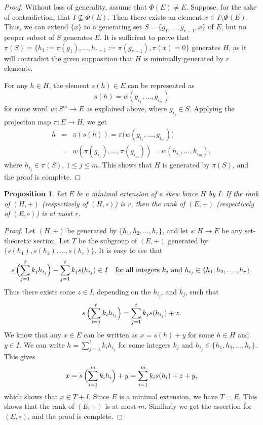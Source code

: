 \documentclass[11pt]{amsart}
\theoremstyle{thrm}
\theoremstyle{plain}
\newtheorem{prop}[thm]{Proposition}
\theoremstyle{definition}
\numberwithin{equation}{section}
\begin{document}
\begin{proof}
	Without loss of generality, assume that $\Phi(E) \neq E$. Suppose, for the sake of contradiction, 
	that $I \not\subseteq \Phi(E)$. Then there exists an element $x \in I \setminus \Phi(E)$. 
	Thus, we can extend $\{x\}$ to a generating set $S = \{ g_1, \ldots, g_{r-1}, x\}$ of  $E$, 
	but no proper subset of $S$ generates $E$.  It is sufficient to prove that  $\pi(S) = \{ h_1 :=\pi(g_1), \ldots, h_{r-1} := \pi(g_{r-1}), \pi(x)=0\}$ generates $H$, as it will contradict the given supposition that $H$ is minimally generated by $r$ elements.
	
	 For any  $h \in H$, the element   $s(h) \in E$  can be represented as 
	\[
	s(h) = w(g_{i_1}, \ldots, g_{i_m})
	\] 
	for some word $w : S^m \to E$ as explained above, where $g_{i_j} \in S$.
	Applying the projection map $\pi: E \to H$, we get
	\begin{eqnarray*}
	h &=& \pi(s(h)) =\pi\big( w(g_{i_1}, \ldots, g_{i_m})  \big)\\
	&=&  w(\pi(g_{i_1}), \ldots, \pi(g_{i_m})) = w(h_{i_1}, \ldots, h_{i_m}),
	\end{eqnarray*}
where $h_{i_j} \in \pi(S)$, $1 \le j \le m$. This shows  that $H$ is generated by $\pi(S)$, and the proof is complete.
\end{proof}





\begin{prop}
	Let $E$ be a minimal extension of a skew brace $H$ by $I$.   If the rank of $(H,+)$ (respectively of $(H,\circ)$) is $r$,  then the rank of $(E,+)$ (respectively of $(E,\circ)$) is at most $r$.
	
	\end{prop}
\begin{proof}
Let $(H,+)$ be generated by $\{h_1,h_2,\ldots,h_r\}$, and let 
$s\colon H \to E$ be any set-theoretic section.  
Let $T$ be the subgroup of $(E, +)$ generated by 
$\{s(h_1),s(h_2),\ldots,s(h_r)\}$.  
It is easy to see that  
\[
s\, \Bigl(\sum_{j=1}^{t}k_j h_{i_j}\Bigr)-
\sum_{j=1}^{t}k_j s(h_{i_j})\in I 
\quad\text{for all integers }k_j \text{ and } h_{i_j} \in \{h_1,h_2,\ldots,h_r\}.
\]
Thus there exists some $z\in I$, depending on the $h_{i_j}$, and $k_j$, such that  
\[
s\, \Bigl(\sum_{i=j}^{t}k_i h_{i_j}\Bigr)
= \sum_{j=1}^{t}k_j s(h_{i_j}) + z.
\]
 We know that any $x \in E$ can be written as $x=s(h)+y$ for some $h \in H$ and $y \in I$.  
We can write $h=\sum_{j=1}^{t}k_i h_{i_j}$ for some integers $k_j$ and $h_{i_j} \in \{h_1,h_2, \ldots, h_r\}$.  
This gives 
\[
x=s\, \Bigl(\sum_{i=1}^{m}k_i h_i\Bigr)+y
= \sum_{i=1}^{m}k_i s(h_i)+z+y,
\]
which shows that $x \in T+I$.   Since $E$ is a minimal extension, we have $T=E$.  This shows that the rank of $(E,+)$ is at most $m$. Similarly we get the assertion for $(E, \circ)$, and the proof is complete.
\end{proof}
\end{document}
